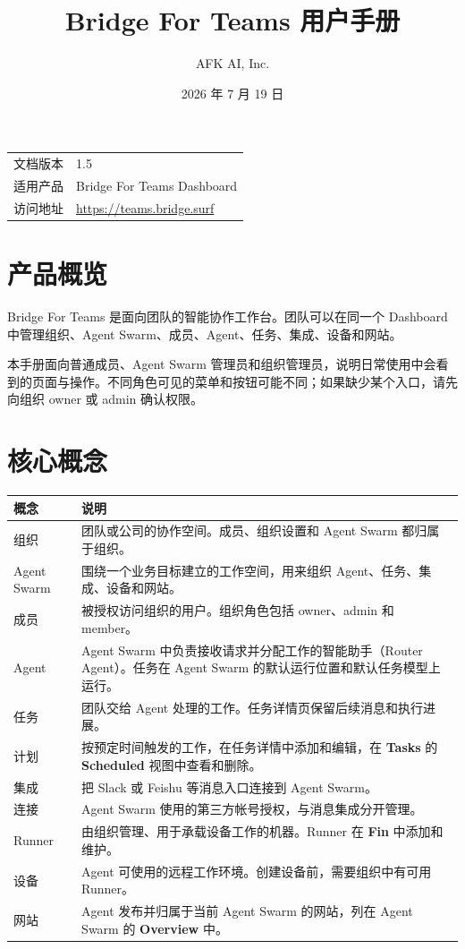 \documentclass[UTF8,a4paper,11pt]{ctexart}
\title{\Huge Bridge For Teams 用户手册}
\author{AFK AI, Inc.}
\date{2026 年 7 月 19 日}
\begin{document}
\maketitle
\thispagestyle{empty}

\vfill
\begin{center}
\begin{tabular}{ll}
\toprule
文档版本 & 1.5 \\
适用产品 & Bridge For Teams Dashboard \\
访问地址 & \url{https://teams.bridge.surf} \\
\bottomrule
\end{tabular}
\end{center}
\vfill

\newpage
\tableofcontents
\newpage

\section{产品概览}

Bridge For Teams 是面向团队的智能协作工作台。团队可以在同一个 Dashboard 中管理组织、Agent Swarm、成员、Agent、任务、集成、设备和网站。

本手册面向普通成员、Agent Swarm 管理员和组织管理员，说明日常使用中会看到的页面与操作。不同角色可见的菜单和按钮可能不同；如果缺少某个入口，请先向组织 owner 或 admin 确认权限。

\section{核心概念}

\begin{longtable}{p{3.2cm}p{10.6cm}}
\toprule
概念 & 说明 \\
\midrule
组织 & 团队或公司的协作空间。成员、组织设置和 Agent Swarm 都归属于组织。 \\
Agent Swarm & 围绕一个业务目标建立的工作空间，用来组织 Agent、任务、集成、设备和网站。 \\
成员 & 被授权访问组织的用户。组织角色包括 owner、admin 和 member。 \\
Agent & Agent Swarm 中负责接收请求并分配工作的智能助手（Router Agent）。任务在 Agent Swarm 的默认运行位置和默认任务模型上运行。 \\
任务 & 团队交给 Agent 处理的工作。任务详情页保留后续消息和执行进展。 \\
计划 & 按预定时间触发的工作，在任务详情中添加和编辑，在 \textbf{Tasks} 的 \textbf{Scheduled} 视图中查看和删除。 \\
集成 & 把 Slack 或 Feishu 等消息入口连接到 Agent Swarm。 \\
连接 & Agent Swarm 使用的第三方帐号授权，与消息集成分开管理。 \\
Runner & 由组织管理、用于承载设备工作的机器。Runner 在 \textbf{Fin} 中添加和维护。 \\
设备 & Agent 可使用的远程工作环境。创建设备前，需要组织中有可用 Runner。 \\
网站 & Agent 发布并归属于当前 Agent Swarm 的网站，列在 Agent Swarm 的 \textbf{Overview} 中。 \\
\bottomrule
\end{longtable}
\end{document}
